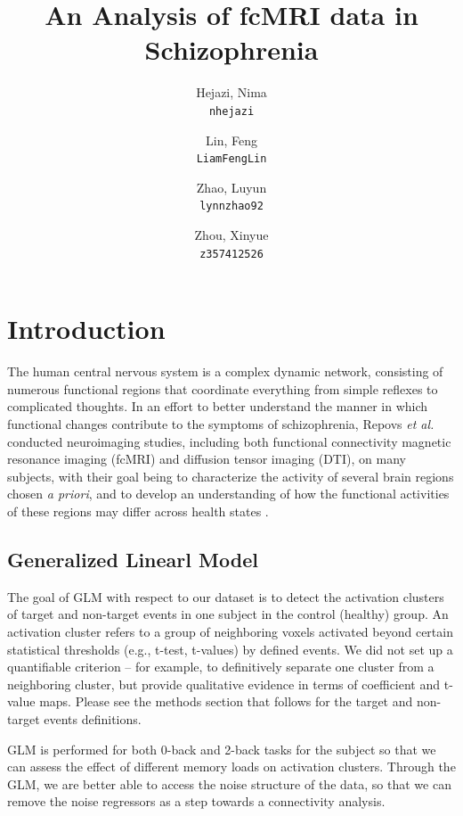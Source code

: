 \documentclass[11pt]{article}
\title{An Analysis of fcMRI data in Schizophrenia}
\author{
  Hejazi, Nima\\
  \texttt{nhejazi}
  \and
  Lin, Feng\\
  \texttt{LiamFengLin}
  \and
  Zhao, Luyun\\
  \texttt{lynnzhao92}
  \and
  Zhou, Xinyue\\
  \texttt{z357412526}
}
\begin{document}
\maketitle


\section{Introduction}

The human central nervous system is a complex dynamic network, consisting of
numerous functional regions that coordinate everything from simple reflexes to
complicated thoughts. In an effort to better understand the manner in which
functional changes contribute to the symptoms of schizophrenia, Repovs \textit{et
al.} conducted neuroimaging studies, including both functional connectivity
magnetic resonance imaging (fcMRI) and diffusion tensor imaging (DTI), on many
subjects, with their goal being to characterize the activity of several brain
regions chosen \textit{a priori}, and to develop an understanding of how the functional 
activities of these regions may differ across health states \cite{repovs2011,repovs2012}.

\subsection{Generalized Linearl Model}

The goal of GLM with respect to our dataset is to detect the activation clusters of target and non-target events in one subject in the control (healthy) group. An activation cluster refers to a group of neighboring voxels activated beyond certain statistical thresholds (e.g., t-test, t-values) by defined events. We did not set up a quantifiable criterion -- for example, to definitively separate one cluster from a neighboring cluster, but provide qualitative evidence in terms of coefficient and t-value maps. Please see the methods section that follows for the target and non-target events definitions. 

GLM is performed for both 0-back and 2-back tasks for the subject so that we can assess the effect of different memory loads on activation clusters. Through the GLM, we are better able to access the noise structure of the data, so that we can remove the noise regressors as a step towards a connectivity analysis.
\end{document}
